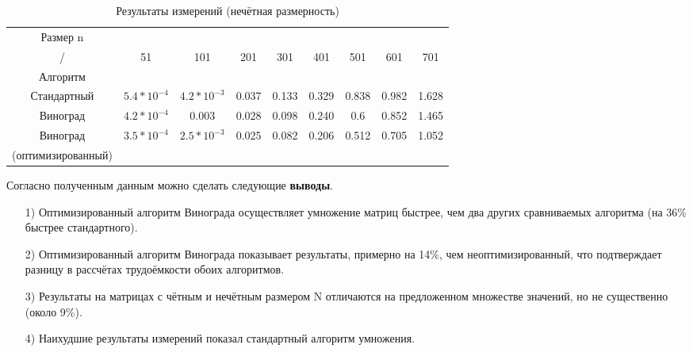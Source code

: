 \begin{table}[ph] \label{table_4_2}
	\caption{Результаты измерений (нечётная размерность)}
	\centering
	\begin{tabular}{|c|c|c|c|c|c|c|c|c|}
		\hline
		Размер n&&&&&&&&\\
		/    & 51 &101 & 201 & 301 & 401 & 501 & 601 & 701\\
		Алгоритм    &&&&&&&&\\
		\hline
		Стандартный & $5.4*10^{-4}$ & $4.2*10^{-3}$ & 0.037 & 0.133 & 0.329 & 0.838 & 0.982 & 1.628\\
		\hline
		Виноград & $4.2*10^{-4}$ & $0.003$ & 0.028 & 0.098 & 0.240 & 0.6 & 0.852 & 1.465\\
		\hline
		Виноград & $3.5*10^{-4}$ & $2.5*10^{-3}$ & 0.025 & 0.082 & 0.206 & 0.512 & 0.705 & 1.052\\
		(оптимизированный) &&&&&&&&\\
		\hline
	\end{tabular}
\end{table}

Согласно полученным данным можно сделать следующие \textbf{выводы}.
\begin{itemize}
	\item[1)]Оптимизированный алгоритм Винограда осуществляет умножение матриц быстрее, чем два других сравниваемых алгоритма (на 36\% быстрее стандартного).
	\item[2)]Оптимизированный алгоритм Винограда показывает результаты, примерно на 14\%, чем неоптимизированный, что подтверждает разницу в рассчётах трудоёмкости обоих алгоритмов.
	\item[3)]Результаты на матрицах с чётным и нечётным размером N отличаются на предложенном множестве значений, но не существенно (около 9\%).
	\item[4)]Наихудшие результаты измерений показал стандартный алгоритм умножения.
	\end{itemize}